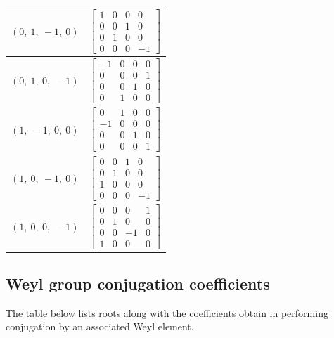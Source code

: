 \documentclass[11pt]{article}
\theoremstyle{definition}
\begin{document}
\begin{longtable}{|l|c|}
    \hline
    $\left( 0, \  1, \  -1, \  0\right)$ & ${\left[\begin{matrix}1 & 0 & 0 & 0\\0 & 0 & 1 & 0\\0 & 1 & 0 & 0\\0 & 0 & 0 & -1\end{matrix}\right]}$ \\
    \hline
    $\left( 0, \  1, \  0, \  -1\right)$ & ${\left[\begin{matrix}-1 & 0 & 0 & 0\\0 & 0 & 0 & 1\\0 & 0 & 1 & 0\\0 & 1 & 0 & 0\end{matrix}\right]}$ \\
    \hline
    $\left( 1, \  -1, \  0, \  0\right)$ & ${\left[\begin{matrix}0 & 1 & 0 & 0\\-1 & 0 & 0 & 0\\0 & 0 & 1 & 0\\0 & 0 & 0 & 1\end{matrix}\right]}$ \\
    \hline
    $\left( 1, \  0, \  -1, \  0\right)$ & ${\left[\begin{matrix}0 & 0 & 1 & 0\\0 & 1 & 0 & 0\\1 & 0 & 0 & 0\\0 & 0 & 0 & -1\end{matrix}\right]}$ \\
    \hline
    $\left( 1, \  0, \  0, \  -1\right)$ & ${\left[\begin{matrix}0 & 0 & 0 & 1\\0 & 1 & 0 & 0\\0 & 0 & -1 & 0\\1 & 0 & 0 & 0\end{matrix}\right]}$ \\
    \hline
\end{longtable}


\subsection{Weyl group conjugation coefficients}

The table below lists roots along with the coefficients obtain in performing conjugation by an associated Weyl element.

\bigskip
\end{document}
